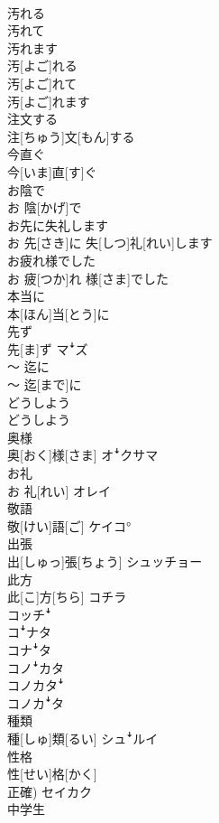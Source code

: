 \documentclass[8pt]{extreport}
\begin{document}
\begin{CJK}{UTF8}{min}
\\	汚れる 
\\	汚れて 
\\	汚れます	
\\	汚[よご]れる 
\\	汚[よご]れて 
\\	汚[よご]れます	
\\	注文する	
\\	注[ちゅう]文[もん]する	
\\	今直ぐ	
\\	今[いま]直[す]ぐ	
\\	お陰で	
\\	お 陰[かげ]で	
\\	お先に失礼します	
\\	お 先[さき]に 失[しつ]礼[れい]します	
\\	お疲れ様でした	
\\	お 疲[つか]れ 様[さま]でした	
\\	本当に	
\\	本[ほん]当[とう]に	
\\	先ず	
\\	先[ま]ず	マꜜズ
\\	〜 迄に	
\\	〜 迄[まで]に	
\\	どうしよう	
\\	どうしよう	
\\	奥様	
\\	奥[おく]様[さま]	オꜜクサマ
\\	お礼	
\\	お 礼[れい]	オレイ
\\	敬語	
\\	敬[けい]語[ご]	ケイコ°
\\	出張	
\\	出[しゅっ]張[ちょう]	シュッチョー
\\	此方	
\\	此[こ]方[ちら]	コチラ 
\\	コッチꜜ 
\\	コꜜナタ 
\\	コナꜜタ 
\\	コノꜜカタ 
\\	コノカタꜜ 
\\	コノカꜜタ
\\	種類	
\\	種[しゅ]類[るい]	シュꜜルイ
\\	性格	
\\	性[せい]格[かく] 
\\	正確)	セイカク
\\	中学生	

\end{CJK}
\end{document}
